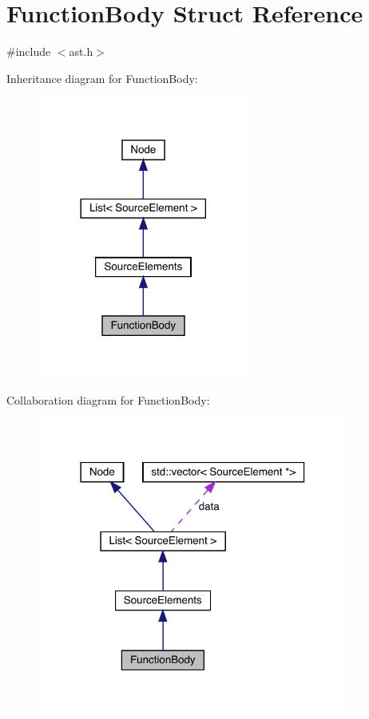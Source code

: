 \hypertarget{struct_function_body}{}\section{Function\+Body Struct Reference}
\label{struct_function_body}


{\ttfamily \#include $<$ast.\+h$>$}



Inheritance diagram for Function\+Body\+:\nopagebreak
\begin{figure}[H]
\begin{center}
\leavevmode
\includegraphics[width=197pt]{struct_function_body__inherit__graph}
\end{center}
\end{figure}


Collaboration diagram for Function\+Body\+:\nopagebreak
\begin{figure}[H]
\begin{center}
\leavevmode
\includegraphics[width=290pt]{struct_function_body__coll__graph}
\end{center}
\end{figure}
